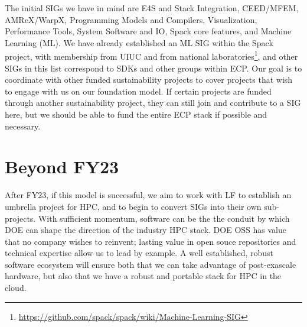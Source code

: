 \documentclass[11pt]{article}
\begin{document}
The initial SIGs we have in mind are E4S and Stack Integration, CEED/MFEM, AMReX/WarpX,
Programming Models and Compilers, Visualization, Performance Tools, System Software and
IO, Spack core features, and Machine Learning (ML). We have already established an ML
SIG within the Spack project, with membership from UIUC and from national
laboratories\footnote{\href{https://github.com/spack/spack/wiki/Machine-Learning-SIG}{https://github.com/spack/spack/wiki/Machine-Learning-SIG}},
and other SIGs in this list correspond to SDKs and other groups within ECP. Our goal is
to coordinate with other funded sustainability projects to cover projects that wish to
engage with us on our foundation model. If certain projects are funded through another
sustainability project, they can still join and contribute to a SIG here, but we should
be able to fund the entire ECP stack if possible and necessary.

\section{Beyond FY23}

After FY23, if this model is successful, we aim to work with LF to establish an umbrella
project for HPC, and to begin to convert SIGs into their own sub-projects. With
sufficient momentum, software can be the the conduit by which DOE can shape the
direction of the industry HPC stack. DOE OSS has value that no company wishes to
reinvent; lasting value in open souce repositories and technical expertise allow us to
lead by example. A well established, robust software ecosystem will ensure both that we
can take advantage of post-exascale hardware, but also that we have a robust and
portable stack for HPC in the cloud.




%
%  


\end{document}
